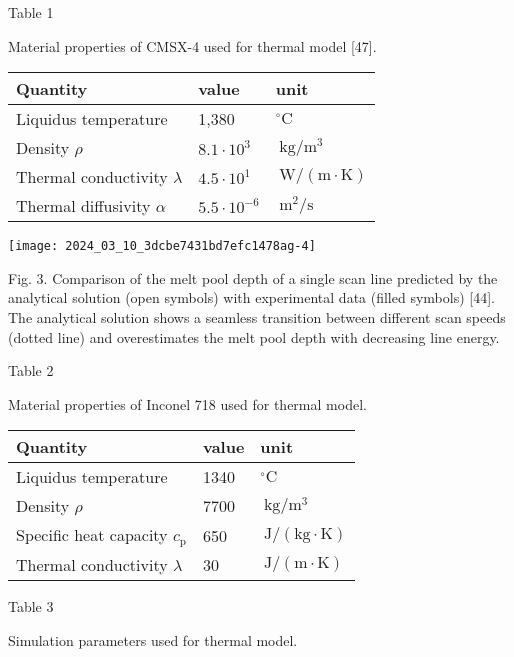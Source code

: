 \documentclass[10pt]{article}
\begin{document}
Table 1

Material properties of CMSX-4 used for thermal model [47].

\begin{center}
\begin{tabular}{lll}
\hline
Quantity & value & unit \\
\hline
Liquidus temperature & 1,380 & ${ }^{\circ} \mathrm{C}$ \\
Density $\rho$ & $8.1 \cdot 10^{3}$ & $\mathrm{~kg} / \mathrm{m}^{3}$ \\
Thermal conductivity $\lambda$ & $4.5 \cdot 10^{1}$ & $\mathrm{~W} /(\mathrm{m} \cdot \mathrm{K})$ \\
Thermal diffusivity $\alpha$ & $5.5 \cdot 10^{-6}$ & $\mathrm{~m}^{2} / \mathrm{s}$ \\
\hline
\end{tabular}
\end{center}

\begin{center}
\texttt{[image: 2024\_03\_10\_3dcbe7431bd7efc1478ag-4]}
\end{center}

Fig. 3. Comparison of the melt pool depth of a single scan line predicted by the analytical solution (open symbols) with experimental data (filled symbols) [44]. The analytical solution shows a seamless transition between different scan speeds (dotted line) and overestimates the melt pool depth with decreasing line energy.

Table 2

Material properties of Inconel 718 used for thermal model.

\begin{center}
\begin{tabular}{lll}
\hline
Quantity & value & unit \\
\hline
Liquidus temperature & 1340 & ${ }^{\circ} \mathrm{C}$ \\
Density $\rho$ & 7700 & $\mathrm{~kg} / \mathrm{m}^{3}$ \\
Specific heat capacity $c_{\mathrm{p}}$ & 650 & $\mathrm{~J} /(\mathrm{kg} \cdot \mathrm{K})$ \\
Thermal conductivity $\lambda$ & 30 & $\mathrm{~J} /(\mathrm{m} \cdot \mathrm{K})$ \\
\hline
\end{tabular}
\end{center}

Table 3

Simulation parameters used for thermal model.
\end{document}
